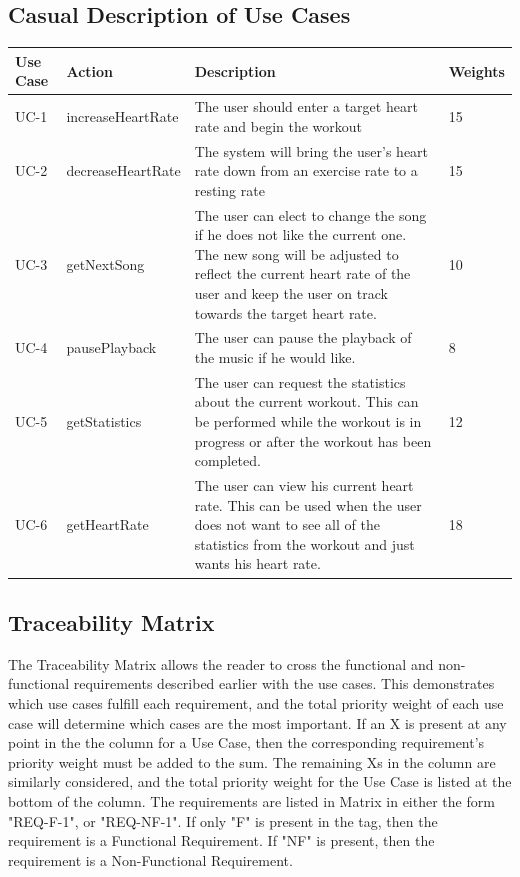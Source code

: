 \documentclass[letterpaper,english, 12pt]{scrreprt}
\begin{document}
\subsection{Casual Description of Use Cases}
\begin{center}
        \begin{tabular}{|C{2cm}|C{2cm}|C{10cm}|}
                \hline
                        Use Case & Action & Description & Weights \\
                \hline
                        UC-1 & increaseHeartRate & The user should enter a target heart rate and begin the workout & 15 \\
                \hline
                        UC-2 & decreaseHeartRate & The system will bring the user's heart rate down from an exercise rate to a resting rate & 15\\
                \hline
                        UC-3 & getNextSong & The user can elect to change the song if he does not like the current one. The new song will be adjusted to reflect the current heart rate of the user and keep the user on track towards the target heart rate. & 10 \\
                \hline
                        UC-4 & pausePlayback & The user can pause the playback of the music if he would like. & 8 \\
                \hline
                        UC-5 & getStatistics & The user can request the statistics about the current workout. This can be performed while the workout is in progress or after the workout has been completed.  & 12 \\
                \hline
                        UC-6 & getHeartRate & The user can view his current heart rate. This can be used when the user does not want to see all of the statistics from the workout and just wants his heart rate.  & 18\\
                \hline
        \end{tabular}
\end{center}

\subsection{Traceability Matrix}
The Traceability Matrix allows the reader to cross the functional and non-functional requirements described earlier with the use cases. This demonstrates which use cases fulfill each requirement, and the total priority weight of each use case will determine which cases are the most important. If an X is present at any point in the the column for a Use Case, then the corresponding requirement's priority weight must be added to the sum. The remaining Xs in the column are similarly considered, and the total priority weight for the Use Case is listed at the bottom of the column. The requirements are listed in Matrix in either the form "REQ-F-1", or "REQ-NF-1". If only "F" is present in the tag, then the requirement is a Functional Requirement. If "NF" is present, then the requirement is a Non-Functional Requirement.
\end{document}
